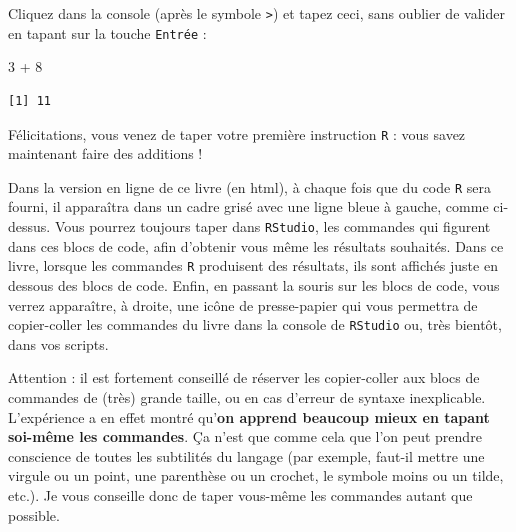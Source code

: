 \documentclass[
  a4paper,
  DIV=11,
  numbers=noendperiod,
  oneside]{scrreprt}
\newenvironment{Shaded}{}{}
\newcommand{\DecValTok}[1]{\textcolor[rgb]{0.00,0.36,0.77}{#1}}
\newcommand{\SpecialCharTok}[1]{\textcolor[rgb]{0.00,0.36,0.77}{#1}}
\begin{document}
Cliquez dans la console (après le symbole \texttt{\textgreater{}}) et
tapez ceci, sans oublier de valider en tapant sur la touche
\texttt{Entrée} :

\begin{Shaded}
\begin{Highlighting}[]
\DecValTok{3} \SpecialCharTok{+} \DecValTok{8}
\end{Highlighting}
\end{Shaded}

\begin{verbatim}
[1] 11
\end{verbatim}

Félicitations, vous venez de taper votre première instruction \texttt{R}
: vous savez maintenant faire des additions !

Dans la version en ligne de ce livre (en html), à chaque fois que du
code \texttt{R} sera fourni, il apparaîtra dans un cadre grisé avec une
ligne bleue à gauche, comme ci-dessus. Vous pourrez toujours taper dans
\texttt{RStudio}, les commandes qui figurent dans ces blocs de code,
afin d'obtenir vous même les résultats souhaités. Dans ce livre, lorsque
les commandes \texttt{R} produisent des résultats, ils sont affichés
juste en dessous des blocs de code. Enfin, en passant la souris sur les
blocs de code, vous verrez apparaître, à droite, une icône de
presse-papier qui vous permettra de copier-coller les commandes du livre
dans la console de \texttt{RStudio} ou, très bientôt, dans vos scripts.

\begin{tcolorbox}[enhanced jigsaw, coltitle=black, toprule=.15mm, opacityback=0, breakable, colback=white, opacitybacktitle=0.6, colframe=quarto-callout-warning-color-frame, leftrule=.75mm, rightrule=.15mm, titlerule=0mm, bottomtitle=1mm, toptitle=1mm, arc=.35mm, title=\textcolor{quarto-callout-warning-color}{\faExclamationTriangle}\hspace{0.5em}{Les risques du ``copier-coller'' {\faIcon{clipboard}}}, colbacktitle=quarto-callout-warning-color!10!white, bottomrule=.15mm, left=2mm]

Attention : il est fortement conseillé de réserver les copier-coller aux
blocs de commandes de (très) grande taille, ou en cas d'erreur de
syntaxe inexplicable. L'expérience a en effet montré qu'\textbf{on
apprend beaucoup mieux {en tapant soi-même les commandes}}. Ça n'est que
comme cela que l'on peut prendre conscience de toutes les subtilités du
langage (par exemple, faut-il mettre une virgule ou un point, une
parenthèse ou un crochet, le symbole moins ou un tilde, etc.). Je vous
conseille donc de taper vous-même les commandes autant que possible.

\end{tcolorbox}
\end{document}
